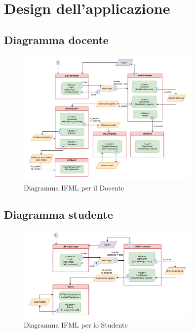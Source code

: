 \documentclass[a4paper,12pt]{scrreprt}
\begin{document}
\section{Design dell'applicazione}

\subsection{Diagramma docente}
\begin{figure}[htbp]
    \centering
    \includegraphics[width=0.8\textwidth]{docenteIFML.drawio.pdf}
    \caption{Diagramma IFML per il Docente}
\end{figure}

\newpage

\subsection{Diagramma studente}
\begin{figure}[htbp]
    \centering
    \includegraphics[width=0.8\textwidth]{studenteIFML.drawio.pdf}
    \caption{Diagramma IFML per lo Studente}
\end{figure}

\newpage
\end{document}
